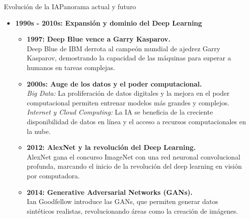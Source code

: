 \documentclass[10pt,border=3pt,tikz]{beamer}
\begin{document}
    \begin{frame}{Evolución de la IA}{Panorama actual y futuro}
        \begin{itemize}
            \item \textbf{1990s - 2010s: Expansión y dominio del Deep Learning}
            \begin{itemize}
                \item \textbf{1997: Deep Blue vence a Garry Kasparov.} \\Deep Blue de IBM derrota al campeón mundial de ajedrez Garry Kasparov, demostrando la capacidad de las máquinas para superar a humanos en tareas complejas.
                
                \item \textbf{2000s: Auge de los datos y el poder computacional.} \\\textit{Big Data:} La proliferación de datos digitales y la mejora en el poder computacional permiten entrenar modelos más grandes y complejos. \textit{Internet y Cloud Computing:} La IA se beneficia de la creciente disponibilidad de datos en línea y el acceso a recursos computacionales en la nube.
                
                \item \textbf{2012: AlexNet y la revolución del Deep Learning.} \\AlexNet gana el concurso ImageNet con una red neuronal convolucional profunda, marcando el inicio de la revolución del deep learning en visión por computadora.
                
                \item \textbf{2014: Generative Adversarial Networks (GANs).} \\Ian Goodfellow introduce las GANs, que permiten generar datos sintéticos realistas, revolucionando áreas como la creación de imágenes.
            \end{itemize}
        \end{itemize}
    \end{frame}
    
\end{document}
